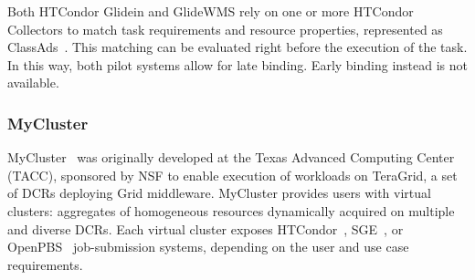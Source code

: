\documentclass{sig-alternate}
\begin{document}

Both HTCondor Glidein and GlideWMS rely on one or more HTCondor Collectors to
match task requirements and resource properties, represented as
ClassAds~\cite{classad_url}. This matching can be evaluated right before the
execution of the task. In this way, both pilot systems allow for late binding.
Early binding instead is not available.


%
\subsubsection{MyCluster}\label{sec:mycluster}

MyCluster~\cite{walker2007personal,mycluster_url} was originally developed at
the Texas Advanced Computing Center (TACC), sponsored by NSF to enable execution
of workloads on TeraGrid, a set of DCRs deploying Grid middleware. MyCluster
provides users with virtual clusters: aggregates of homogeneous resources
dynamically acquired on multiple and diverse DCRs. Each virtual cluster exposes
HTCondor~\cite{thain2005}, SGE~\cite{chase2003dynamic}, or
OpenPBS~\cite{openpbs_url} job-submission systems, depending on the user and use
case requirements.
\end{document}
